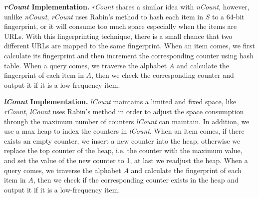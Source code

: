 \documentclass[conference]{IEEEtran}
\begin{document}
\textbf{\emph{rCount} Implementation.} \emph{rCount} shares a similar idea with \emph{nCount}, however, unlike \emph{nCount}, \emph{rCount} uses Rabin's method \cite{rabin1981fingerprinting} to hash each item in $S$ to a 64-bit fingerprint, or it will consume too much space especially when the items are URLs. With this fingerprinting technique, there is a small chance that two diﬀerent URLs are mapped to the same fingerprint. When an item comes, we first calculate its fingerprint and then increment the corresponding counter using hash table. When a query comes, we traverse the alphabet $A$ and calculate the fingerprint of each item in $A$, then we check the corresponding counter and output it if it is a low-frequency item.\par

\textbf{\emph{lCount} Implementation.} \emph{lCount} maintains a limited and fixed space, like \emph{rCount}, \emph{lCount} uses Rabin's method in order to adjust the space consumption through the maximum number of counters \emph{lCount} can maintain. In addition, we use a max heap to index the counters in \emph{lCount}. When an item comes, if there exists an empty counter, we insert a new counter into the heap, otherwise we replace the top counter of the heap, i.e. the counter with the maximum value, and set the value of the new counter to 1, at last we readjust the heap. When a query comes, we traverse the alphabet $A$ and calculate the fingerprint of each item in $A$, then we check if the corresponding counter exists in the heap and output it if it is a low-frequency item.\par
\end{document}
